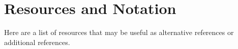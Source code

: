 \documentclass[letter,12pt]{book}
\renewcommand{\0}{\mathbf{0}}
\begin{document}




%	
%	
%
%	
	
	
	\cleardoublepage

	
	
	\cleardoublepage

	
	\cleardoublepage


	\setlength{\parskip}{3.5pt} %
	\tableofcontents
	\cleardoublepage
	
	\mainmatter
	
	


\chapter{Resources and Notation}
Here are a list of resources that may be useful as alternative references or additional references.
\end{document}
